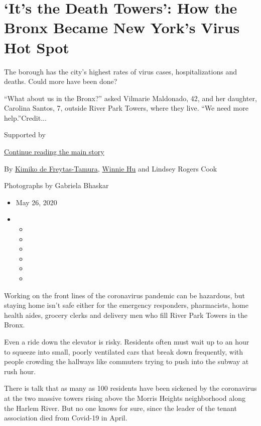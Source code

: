 \hypertarget{its-the-death-towers-how-the-bronx-became-new-yorks-virus-hot-spot}{%
\section{`It's the Death Towers': How the Bronx Became New York's Virus
Hot
Spot}\label{its-the-death-towers-how-the-bronx-became-new-yorks-virus-hot-spot}}

The borough has the city's highest rates of virus cases,
hospitalizations and deaths. Could more have been done?

``What about us in the Bronx?'' asked Vilmarie Maldonado, 42, and her
daughter, Carolina Santos, 7, outside River Park Towers, where they
live. ``We need more help.''Credit...

Supported by

\protect\hyperlink{after-sponsor}{Continue reading the main story}

By \href{https://www.nytimes.com/by/kimiko-de-freytas-tamura}{Kimiko de
Freytas-Tamura}, \href{https://www.nytimes.com/by/winnie-hu}{Winnie Hu}
and Lindsey Rogers Cook

Photographs by Gabriela Bhaskar

\begin{itemize}
\item
  May 26, 2020
\item
  \begin{itemize}
  \item
  \item
  \item
  \item
  \item
  \item
  \end{itemize}
\end{itemize}

Working on the front lines of the coronavirus pandemic can be hazardous,
but staying home isn't safe either for the emergency responders,
pharmacists, home health aides, grocery clerks and delivery men who fill
River Park Towers in the Bronx.

Even a ride down the elevator is risky. Residents often must wait up to
an hour to squeeze into small, poorly ventilated cars that break down
frequently, with people crowding the hallways like commuters trying to
push into the subway at rush hour.

There is talk that as many as 100 residents have been sickened by the
coronavirus at the two massive towers rising above the Morris Heights
neighborhood along the Harlem River. But no one knows for sure, since
the leader of the tenant association died from Covid-19 in April.

